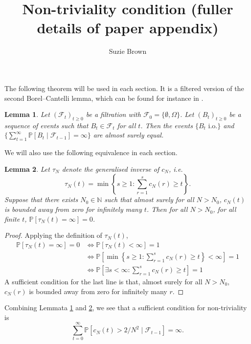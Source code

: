 \documentclass{article}
\title{Non-triviality condition (fuller details of paper appendix)}
\author{Suzie Brown}
\newtheorem{lemma}{Lemma}
\newcommand{\Prob}{\mathbb{P}}
\newcommand{\1}[1]{\mathbb{I}_{#1}}
\begin{document}
\maketitle
\thispagestyle{fancy}

The following theorem will be used in each section. It is a filtered version of the second Borel--Cantelli lemma, which can be found for instance in \citet[Theorem 4.3.4]{durrett2019}.
\begin{lemma}\label{lem:BC2filtered}
Let $ (\mathcal{F}_t)_{t\geq 0}$ be a filtration with $\mathcal{F}_0 = \{\emptyset, \Omega\}$. Let $(B_t)_{t\geq 0}$ be a sequence of events such that $B_t \in \mathcal{F}_t$ for all $t$.
Then the events $\{ B_t \text{ i.o.} \}$ and $\{ \sum_{t=1}^\infty \Prob[B_t \mid \mathcal{F}_{t-1} ] =\infty \}$ are almost surely equal.
\end{lemma}

We will also use the following equivalence in each section.
\begin{lemma}\label{lem:nontriv_sufficientcond}
Let $\tau_N$ denote the generalised inverse of $c_N$, i.e.\
\begin{equation*}
\tau_N(t) = \min \left\{ s\geq 1 : \sum_{r=1}^s c_N(r) \geq t \right\} .
\end{equation*}
Suppose that there exists $N_0 \in \mathbb{N}$ such that almost surely for all $N>N_0$, $c_N(t)$ is bounded away from zero for infinitely many $t$.
Then for all $N>N_0$, for all finite $t$, $\Prob[\tau_N(t) = \infty] =0$.
\end{lemma}

\begin{proof}
Applying the definition of $\tau_N(t)$,
\begin{align*}
\Prob[\tau_N(t) = \infty] =0 &\Leftrightarrow \Prob[\tau_N(t) < \infty] =1 \\
&\Leftrightarrow \Prob\left[ \min \left\{s \geq 1 : \sum_{r=1}^s c_N(r) \geq t \right\} < \infty \right] =1 \\
&\Leftrightarrow \Prob\left[ \exists s<\infty : \sum_{r=1}^s c_N(r) \geq t \right] =1
\end{align*}
A sufficient condition for the last line is that, almost surely for all $N>N_0$, $c_N(r)$ is bounded away from zero for infinitely many $r$.
\end{proof}

Combining Lemmata \ref{lem:BC2filtered} and \ref{lem:nontriv_sufficientcond}, we see that a sufficient condition for non-triviality is
\begin{equation}\label{eq:nontriv_sufficientcond}
\sum_{t=0}^\infty \Prob[ c_N(t) > 2/N^2 \mid \mathcal{F}_{t-1}] = \infty .
\end{equation}
\end{document}
